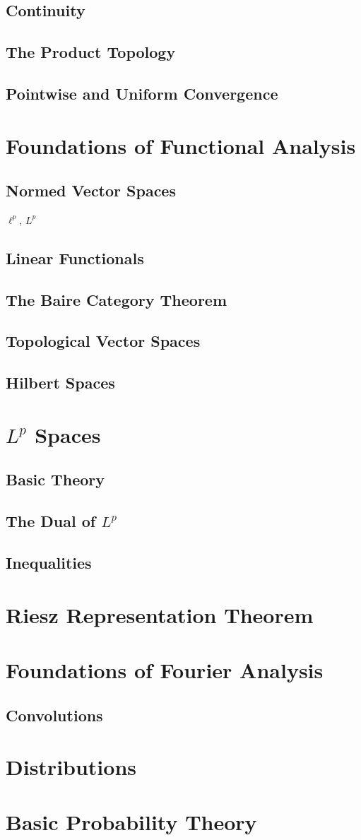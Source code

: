 \documentclass{article}
\theoremstyle{definition}
\begin{document}
\subsection{Continuity}
\subsection{The Product Topology}
\subsection{Pointwise and Uniform Convergence}
\section{Foundations of Functional Analysis}
\subsection{Normed Vector Spaces}
$ \ell^p $, $ L^p $
\subsection{Linear Functionals}
\subsection{The Baire Category Theorem}
\subsection{Topological Vector Spaces}
\subsection{Hilbert Spaces}
\section{$ L^p $ Spaces}
\subsection{Basic Theory}
\subsection{The Dual of $ L^p $}
\subsection{Inequalities}
\section{Riesz Representation Theorem}
\section{Foundations of Fourier Analysis}
\subsection{Convolutions}
\section{Distributions}
\section{Basic Probability Theory}
\newpage
{} 
\end{document}

